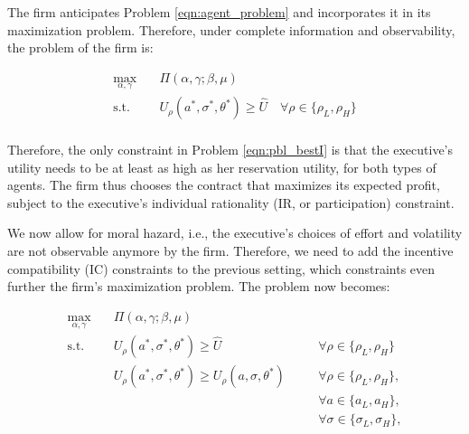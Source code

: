 The firm anticipates Problem \ref*{eqn:agent_problem} and incorporates it in its maximization problem. Therefore, under complete information and observability, the problem of the firm is:

\begin{equation}
    \label{eqn:pbl_bestI}
    \begin{aligned}
    \max_{\alpha, \gamma} \quad & \Pi (\alpha, \gamma; \beta, \mu) \\
    \textrm{s.t.}       \quad & U_\rho(a^*, \sigma^*, \theta^*) \ge \hat{U} \quad \forall \rho \in \{ \rho_L, \rho_H \}  \\
    \end{aligned}
\end{equation}
\vspace*{4pt}

Therefore, the only constraint in Problem \ref*{eqn:pbl_bestI} is that the executive's utility needs to be at least as high as her reservation utility, for both types of agents. The firm thus chooses the contract that maximizes its expected profit, subject to the executive's individual rationality (IR, or participation) constraint.

We now allow for moral hazard, i.e., the executive's choices of effort and volatility are not observable anymore by the firm. Therefore, we need to add the incentive compatibility (IC) constraints to the previous setting, which constraints even further the firm's maximization problem. The problem now becomes:

\begin{equation}
    \label{eqn:pbl_bestII}
    \begin{alignedat}{2}
        \max_{\alpha, \gamma} \quad & \Pi (\alpha, \gamma; \beta, \mu) \\
        \textrm{s.t.}       \quad & U_\rho(a^*, \sigma^*, \theta^*) \ge \hat{U} & \quad & \forall \rho \in \{ \rho_L, \rho_H \} \\
                            \quad & U_\rho(a^*, \sigma^*, \theta^*) \ge U_\rho(a, \sigma, \theta^*) & & \forall \rho \in \{ \rho_L, \rho_H \}, \\
                            \quad & & &\forall a \in \{ a_L, a_H \}, \\
                            \quad & & & \forall \sigma \in \{ \sigma_L, \sigma_H \}, \\
    \end{alignedat}
\end{equation}
\vspace*{4pt}

